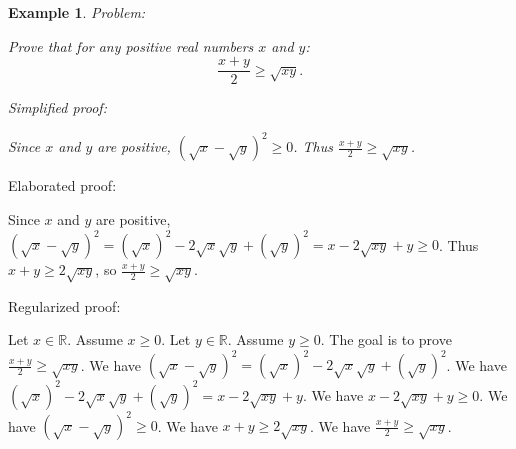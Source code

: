 \documentclass{article}
\newtheorem{example}{Example}
\begin{document}
\begin{example}
Problem:
\begin{tcolorbox}[colback=yellow!10, width=\linewidth]
Prove that for any positive real numbers $x$ and $y$:
    $$\frac{x+y}{2} \geq \sqrt{xy}.$$
\end{tcolorbox}

Simplified proof:
\begin{tcolorbox}[colback=blue!10, width=\linewidth]
Since $x$ and $y$ are positive, $(\sqrt x - \sqrt y)^2 \ge 0$. Thus $\frac{x+y}{2} \ge \sqrt{xy}$.
\end{tcolorbox}
\end{example}

Elaborated proof:
\begin{tcolorbox}[colback=green!10, width=\linewidth]
Since $x$ and $y$ are positive, $(\sqrt x - \sqrt y)^2 = (\sqrt x)^2 - 2\sqrt x \sqrt y + (\sqrt y)^2 = x - 2\sqrt{xy} + y \ge 0$. Thus $x + y \ge 2\sqrt{xy}$, so $\frac{x+y}{2} \ge \sqrt{xy}$.
\end{tcolorbox}

Regularized proof:
\begin{tcolorbox}[colback=red!10, width=\linewidth]
Let $x\in\mathbb{R}$. Assume $x\ge 0$.
Let $y\in\mathbb{R}$. Assume $y\ge 0$.
The goal is to prove $\frac{x+y}{2} \ge \sqrt{xy}$.
We have ${{(\sqrt x - \sqrt y)}}^2 = {{(\sqrt x)}}^2 - 2\sqrt x \sqrt y + {{(\sqrt y)}}^2$.
We have ${{(\sqrt x)}}^2 - 2\sqrt x \sqrt y + {{(\sqrt y)}}^2 = x - 2\sqrt{xy} + y$.
We have $x - 2\sqrt{xy} + y \ge 0$.
We have ${{(\sqrt x - \sqrt y)}}^2 \ge 0$.
We have $x + y \ge 2\sqrt{xy}$.
We have $\frac{x+y}{2} \ge \sqrt{xy}$.
\end{tcolorbox}
\end{document}
